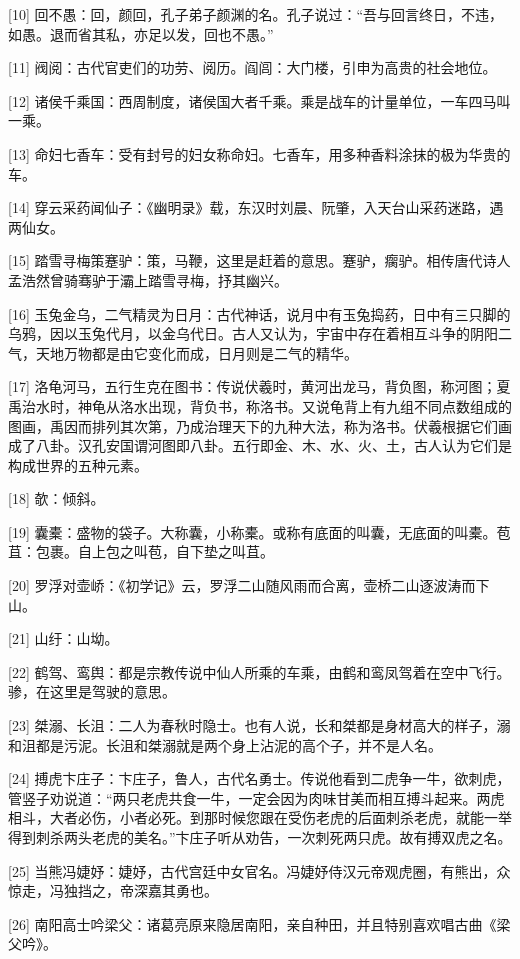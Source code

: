 \documentclass[12pt,UTF8]{ctexbook}
\begin{document}
[10] 回不愚：回，颜回，孔子弟子颜渊的名。孔子说过：“吾与回言终日，不违，如愚。退而省其私，亦足以发，回也不愚。”

[11] 阀阅：古代官吏们的功劳、阅历。阎闾：大门楼，引申为高贵的社会地位。

[12] 诸侯千乘国：西周制度，诸侯国大者千乘。乘是战车的计量单位，一车四马叫一乘。

[13] 命妇七香车：受有封号的妇女称命妇。七香车，用多种香料涂抹的极为华贵的车。

[14] 穿云采药闻仙子：《幽明录》载，东汉时刘晨、阮肇，入天台山采药迷路，遇两仙女。

[15] 踏雪寻梅策蹇驴：策，马鞭，这里是赶着的意思。蹇驴，瘸驴。相传唐代诗人孟浩然曾骑骞驴于灞上踏雪寻梅，抒其幽兴。

[16] 玉兔金乌，二气精灵为日月：古代神话，说月中有玉兔捣药，日中有三只脚的乌鸦，因以玉兔代月，以金乌代日。古人又认为，宇宙中存在着相互斗争的阴阳二气，天地万物都是由它变化而成，日月则是二气的精华。

[17] 洛龟河马，五行生克在图书：传说伏羲时，黄河出龙马，背负图，称河图；夏禹治水时，神龟从洛水出现，背负书，称洛书。又说龟背上有九组不同点数组成的图画，禹因而排列其次第，乃成治理天下的九种大法，称为洛书。伏羲根据它们画成了八卦。汉孔安国谓河图即八卦。五行即金、木、水、火、土，古人认为它们是构成世界的五种元素。

[18] 欹：倾斜。

[19] 囊橐：盛物的袋子。大称囊，小称橐。或称有底面的叫囊，无底面的叫橐。苞苴：包裹。自上包之叫苞，自下垫之叫苴。

[20] 罗浮对壶峤：《初学记》云，罗浮二山随风雨而合离，壶桥二山逐波涛而下山。

[21] 山纡：山坳。

[22] 鹤驾、鸾舆：都是宗教传说中仙人所乘的车乘，由鹤和鸾凤驾着在空中飞行。骖，在这里是驾驶的意思。

[23] 桀溺、长沮：二人为春秋时隐士。也有人说，长和桀都是身材高大的样子，溺和沮都是污泥。长沮和桀溺就是两个身上沾泥的高个子，并不是人名。

[24] 搏虎卞庄子：卞庄子，鲁人，古代名勇士。传说他看到二虎争一牛，欲刺虎，管竖子劝说道：“两只老虎共食一牛，一定会因为肉味甘美而相互搏斗起来。两虎相斗，大者必伤，小者必死。到那时候您跟在受伤老虎的后面刺杀老虎，就能一举得到刺杀两头老虎的美名。”卞庄子听从劝告，一次刺死两只虎。故有搏双虎之名。

[25] 当熊冯婕妤：婕妤，古代宫廷中女官名。冯婕妤侍汉元帝观虎圈，有熊出，众惊走，冯独挡之，帝深嘉其勇也。

[26] 南阳高士吟梁父：诸葛亮原来隐居南阳，亲自种田，并且特别喜欢唱古曲《梁父吟》。
\end{document}
